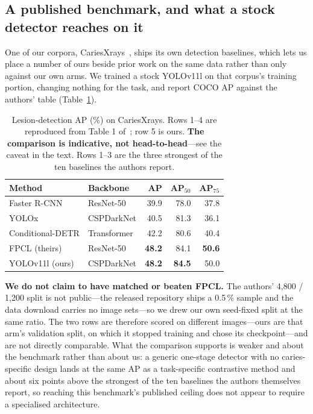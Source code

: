 \documentclass[conference]{IEEEtran}
\begin{document}
\subsection{A published benchmark, and what a stock detector reaches on it}
\label{sec:benchmarkrow}
One of our corpora, CariesXrays~\cite{chen2024cariesxrays}, ships its own
detection baselines, which lets us place a number of ours beside prior work on
the same data rather than only against our own arms. We trained a stock YOLOv11l
on that corpus's training portion, changing nothing for the task, and report COCO
AP against the authors' table (Table~\ref{tab:fpcl}).

\begin{table}[t]
\caption{Lesion-detection AP (\%) on CariesXrays. Rows 1--4 are reproduced from
Table 1 of~\cite{chen2024cariesxrays}; row 5 is ours. \textbf{The comparison is
indicative, not head-to-head}---see the caveat in the text. Rows 1--3 are the
three strongest of the ten baselines the authors report.}
\label{tab:fpcl}
\centering
\small
\setlength{\tabcolsep}{4pt}
\begin{tabular}{llrrr}
\toprule
Method & Backbone & AP & AP$_{50}$ & AP$_{75}$ \\
\midrule
Faster R-CNN & ResNet-50 & 39.9 & 78.0 & 37.8 \\
YOLOx & CSPDarkNet & 40.5 & 81.3 & 36.1 \\
Conditional-DETR & Transformer & 42.2 & 80.6 & 40.4 \\
FPCL (theirs) & ResNet-50 & \textbf{48.2} & 84.1 & \textbf{50.6} \\
\midrule
YOLOv11l (ours) & CSPDarkNet & \textbf{48.2} & \textbf{84.5} & 50.0 \\
\bottomrule
\end{tabular}
\end{table}

\textbf{We do not claim to have matched or beaten FPCL.} The authors' 4{,}800 /
1{,}200 split is not public---the released repository ships a 0.5\,\% sample and
the data download carries no image sets---so we drew our own seed-fixed split at
the same ratio. The two rows are therefore scored on different images---ours are
that arm's validation split, on which it stopped training and chose its
checkpoint---and are not directly comparable. What the comparison supports is weaker and about the
benchmark rather than about us: a generic one-stage detector with no
caries-specific design lands at the same AP as a task-specific contrastive method
and about six points above the strongest of the ten baselines the authors
themselves report, so reaching this benchmark's published ceiling does not appear
to require a specialised architecture.
\end{document}
